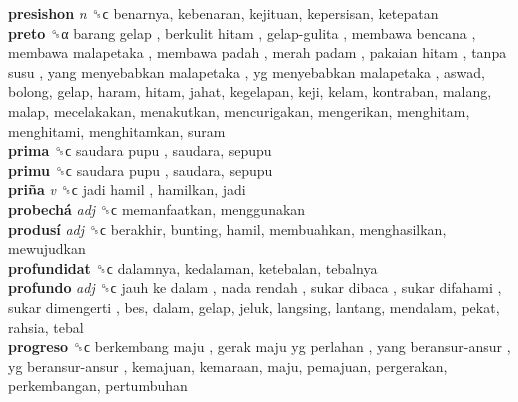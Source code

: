 \textbf{presishon} \emph{n}  ␝ϲ  benarnya, kebenaran, kejituan, kepersisan, ketepatan  \\
\textbf{preto} ␝α   barang gelap ,  berkulit hitam ,  gelap-gulita ,  membawa bencana ,  membawa malapetaka ,  membawa padah ,  merah padam ,  pakaian hitam ,  tanpa susu ,  yang menyebabkan malapetaka ,  yg menyebabkan malapetaka , aswad, bolong, gelap, haram, hitam, jahat, kegelapan, keji, kelam, kontraban, malang, malap, mecelakakan, menakutkan, mencurigakan, mengerikan, menghitam, menghitami, menghitamkan, suram  \\
\textbf{prima} ␝ϲ   saudara pupu , saudara, sepupu  \\
\textbf{primu} ␝ϲ   saudara pupu , saudara, sepupu  \\
\textbf{priña} \emph{v}  ␝ϲ   jadi hamil , hamilkan, jadi  \\
\textbf{probechá} \emph{adj}  ␝ϲ  memanfaatkan, menggunakan  \\
\textbf{produsí} \emph{adj}  ␝ϲ  berakhir, bunting, hamil, membuahkan, menghasilkan, mewujudkan  \\
\textbf{profundidat} ␝ϲ  dalamnya, kedalaman, ketebalan, tebalnya  \\
\textbf{profundo} \emph{adj}  ␝ϲ   jauh ke dalam ,  nada rendah ,  sukar dibaca ,  sukar difahami ,  sukar dimengerti , bes, dalam, gelap, jeluk, langsing, lantang, mendalam, pekat, rahsia, tebal  \\
\textbf{progreso} ␝ϲ   berkembang maju ,  gerak maju yg perlahan ,  yang beransur-ansur ,  yg beransur-ansur , kemajuan, kemaraan, maju, pemajuan, pergerakan, perkembangan, pertumbuhan  \\
